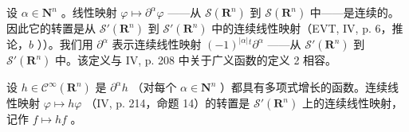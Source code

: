 设 \(\alpha \in \mathbf{N}^n\) 。线性映射 \(\varphi \mapsto \partial^\alpha \varphi\) ——从 \(\mathcal{S}(\mathbf{R}^n)\) 到 \(\mathcal{S}(\mathbf{R}^n)\) 中——是连续的。因此它的转置是从 \(\mathcal{S}'(\mathbf{R}^n)\) 到 \(\mathcal{S}'(\mathbf{R}^n)\) 中的连续线性映射（EVT, IV, p. 6，推论，\(b\) ））。我们用 \(\partial^\alpha\) 表示连续线性映射 \((-1)^{|\alpha|}{}^{t}\partial^\alpha\) ——从 \(\mathcal{S}'(\mathbf{R}^n)\) 到 \(\mathcal{S}'(\mathbf{R}^n)\) 中。该定义与 IV, p. 208 中关于广义函数的定义 2 相容。

设 \(h \in \mathcal{C}^{\infty}(\mathbf{R}^{n})\) 是 \(\partial^{\alpha}h\) （对每个 \(\alpha \in \mathbf{N}^{n}\) ）都具有多项式增长的函数。连续线性映射 \(\varphi \mapsto h\varphi\) （IV, p. 214，命题 14）的转置是 \(\mathcal{S}'(\mathbf{R}^{n})\) 上的连续线性映射，记作 \(f \mapsto hf\) 。